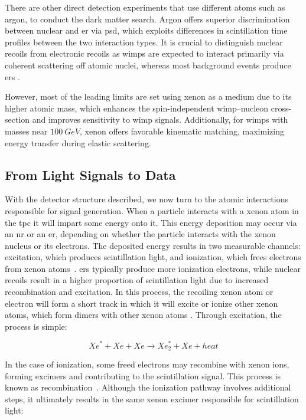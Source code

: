 There are other direct detection experiments that use different atoms such as argon, to conduct the dark matter search. Argon offers superior discrimination between nuclear and \acrfull{er} via \acrfull{psd}, which exploits differences in scintillation time profiles between the two interaction types. It is crucial to distinguish nuclear recoils from electronic recoils as \glspl{wimp} are expected to interact primarily via coherent scattering off atomic nuclei, whereas most background events produce \glspl{er} \cite{Lippincott2008}. 

However, most of the leading limits are set using xenon as a medium due to its higher atomic mass, which enhances the spin-independent \gls{wimp}–nucleon cross-section and improves sensitivity to \gls{wimp} signals. Additionally, for \glspl{wimp} with masses near $\SI{100}{GeV}$, xenon offers favorable kinematic matching, maximizing energy transfer during elastic scattering.

\subsection{From Light Signals to Data}

With the detector structure described, we now turn to the atomic interactions responsible for signal generation. When a particle interacts with a xenon atom in the \gls{tpc} it will impart some energy onto it. This energy deposition may occur via an \gls{nr} or an \gls{er}, depending on whether the particle interacts with the xenon nucleus or its electrons. The deposited energy results in two measurable channels: excitation, which produces scintillation light, and ionization, which frees electrons from xenon atoms~\cite{Lanqing2025thesis}. \Glspl{er} typically produce more ionization electrons, while nuclear recoils result in a higher proportion of scintillation light due to increased recombination and excitation. In this process, the recoiling xenon atom or electron will form a short track in which it will excite or ionize other xenon atoms, which form dimers with other xenon atoms \cite{VChepel_2013}. Through excitation, the process is simple:

$$Xe^* +  Xe +  Xe\rightarrow Xe_2^* +  Xe + heat$$

In the case of ionization, some freed electrons may recombine with xenon ions, forming excimers and contributing to the scintillation signal. This process is known as recombination~\cite{VChepel_2013}. Although the ionization pathway involves additional steps, it ultimately results in the same xenon excimer responsible for scintillation light:

